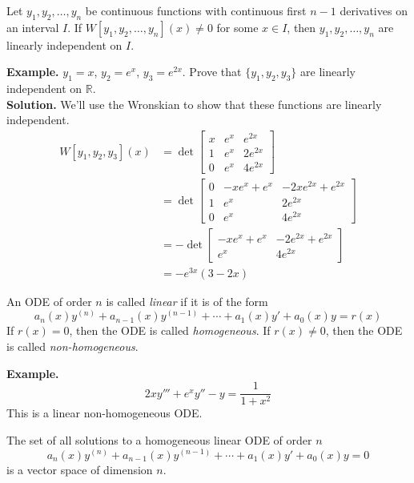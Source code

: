\documentclass[openany]{report}
\begin{document}
\begin{theorem}
    Let $y_1,y_2,\ldots,y_n$ be continuous functions with continuous first $n-1$ derivatives on an interval $I$. If $W[y_1,y_2,\ldots,y_n](x) \neq 0$ for some $x \in I$, then $y_1,y_2,\ldots,y_n$ are linearly independent on $I$.
\end{theorem}
\textbf{Example.} $y_1 = x$, $y_2 = e^x$, $y_3 = e^{2x}$. Prove that $\{y_1,y_2,y_3\}$ are linearly independent on $\mathbb{R}$.\\[3ex]
\textbf{Solution.} We'll use the Wronskian to show that these functions are linearly independent.
\begin{align*}
    W[y_1,y_2,y_3](x) &=  \det\begin{bmatrix}
        x & e^x & e^{2x}\\
        1 & e^x & 2e^{2x}\\
        0 & e^x & 4e^{2x}
    \end{bmatrix}\\
    &=\det \begin{bmatrix}
        0 & -xe^x + e^x & -2xe^{2x}+e^{2x}\\
        1 & e^{x} & 2e^{2x}\\
        0 & e^x & 4e^{2x}
    \end{bmatrix}\tag{$-xR_2 + R_1 \to R_1$}\\
    &= -\det\begin{bmatrix}
        -xe^x + e^x & -2e^{2x} + e^{2x}\\
        e^x & 4e^{2x}
    \end{bmatrix}\\
    &= -e^{3x}(3-2x)
\end{align*}

\begin{definition}
    An ODE of order $n$ is called \emph{linear} if it is of the form 
    \[a_n(x) y^{(n)} + a_{n-1}(x)y^{(n-1)} + \cdots + a_1(x)y' + a_0(x)y = r(x)\]
    If $r(x) = 0$, then the ODE is called \emph{homogeneous}. If $r(x) \neq 0$, then the ODE is called \emph{non-homogeneous}.
\end{definition}

\textbf{Example.} 
\[2xy''' + e^xy'' - y = \frac{1}{1+x^2}\]
This is a linear non-homogeneous ODE.
\begin{theorem}
    The set of all solutions to a homogeneous linear ODE of order $n$
    \[a_n(x) y^{(n)} + a_{n-1}(x)y^{(n-1)} + \cdots + a_1(x)y' + a_0(x)y = 0\]
    is a vector space of dimension $n$.
\end{theorem}
\end{document}
